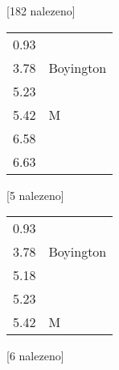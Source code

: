 \begin{table}[H]
\begin{tt}

\horizlina

\noindent
\begin{minipage}[t]{.5\textwidth}\vspace{0pt}
 [182 nalezeno]\vspace{5pt}

\begin{tabulary}{1.1\textwidth}{LL}
0.93 &   \\
3.78 &  Boyington \\
5.23 &   \\
5.42 &  M  \\
6.58 &   \\
6.63 &   \\
\end{tabulary}
\end{minipage}
\begin{minipage}[t]{.5\textwidth}\vspace{0pt}
 [5 nalezeno]\vspace{5pt}

\begin{tabulary}{1.1\textwidth}{LL}
0.93 &   \\
3.78 &  Boyington \\
5.18 &   \\
5.23 &   \\
5.42 &  M  \\
\end{tabulary}
\end{minipage}

\horizlina

\noindent
\begin{minipage}[t]{.5\textwidth}\vspace{0pt}
 [6 nalezeno]\vspace{5pt}


\end{minipage}
\end{tt}
\end{table}
